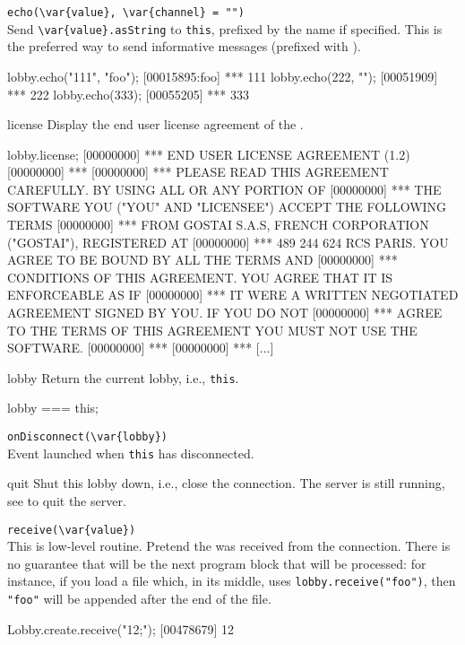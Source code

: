 \begin{urbiscriptapi}
\item \lstinline|echo(\var{value}, \var{channel} = "")|\\
  Send \lstinline|\var{value}.asString| to \lstinline|this|, prefixed
  by the   name if specified.  This is
  the preferred way to send informative messages (prefixed with
  \samp{***}).
\begin{urbiscript}
lobby.echo("111", "foo");
[00015895:foo] *** 111
lobby.echo(222, "");
[00051909] *** 222
lobby.echo(333);
[00055205] *** 333
\end{urbiscript}


\item[license]
  Display the end user license agreement of the \usdk.
\begin{urbiunchecked}
lobby.license;
[00000000] *** END USER LICENSE AGREEMENT (1.2)
[00000000] ***
[00000000] *** PLEASE READ THIS AGREEMENT CAREFULLY.  BY USING ALL OR ANY PORTION OF
[00000000] *** THE SOFTWARE YOU ("YOU" AND "LICENSEE") ACCEPT THE FOLLOWING TERMS
[00000000] *** FROM GOSTAI S.A.S, FRENCH CORPORATION ("GOSTAI"), REGISTERED AT
[00000000] *** 489 244 624 RCS PARIS.  YOU AGREE TO BE BOUND BY ALL THE TERMS AND
[00000000] *** CONDITIONS OF THIS AGREEMENT.  YOU AGREE THAT IT IS ENFORCEABLE AS IF
[00000000] *** IT WERE A WRITTEN NEGOTIATED AGREEMENT SIGNED BY YOU.  IF YOU DO NOT
[00000000] *** AGREE TO THE TERMS OF THIS AGREEMENT YOU MUST NOT USE THE SOFTWARE.
[00000000] ***
[00000000] *** [...]
\end{urbiunchecked}

\item[lobby]
  Return the current lobby, i.e., \lstinline|this|.
\begin{urbiassert}
lobby === this;
\end{urbiassert}

\item \lstinline|onDisconnect(\var{lobby})|\\
  Event launched when \lstinline|this| has disconnected.

\item[quit] Shut this lobby down, i.e., close the connection.  The
  server is still running, see  to quit the
  server.

\item \lstinline|receive(\var{value})|\\
  This is low-level routine.  Pretend the 
   was received from the connection.  There is no guarantee
  that  will be the next program block that will be
  processed: for instance, if you load a file which, in its middle,
  uses \lstinline|lobby.receive("foo")|, then \lstinline|"foo"| will
  be appended after the end of the file.
\begin{urbiscript}
Lobby.create.receive("12;");
[00478679] 12
\end{urbiscript}


\end{urbiscriptapi}
